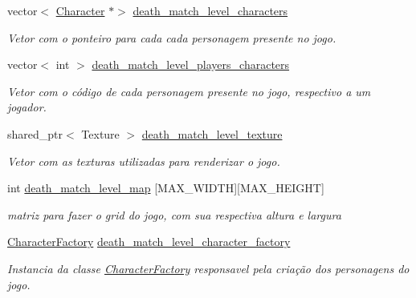 \begin{DoxyCompactItemize}
vector$<$ \mbox{\hyperlink{classCharacter}{Character}} $\ast$$>$ \mbox{\hyperlink{classDeathMatchLevel_aafe478e224732978a08161ab877a50aa}{death\+\_\+match\+\_\+level\+\_\+characters}}
\begin{DoxyCompactList}\small\item\em Vetor com o ponteiro para cada cada personagem presente no jogo. \end{DoxyCompactList}\item 
\mbox{\label{classDeathMatchLevel_a83bd77eb5fa0802f98f6e032353c7954}} 
vector$<$ int $>$ \mbox{\hyperlink{classDeathMatchLevel_a83bd77eb5fa0802f98f6e032353c7954}{death\+\_\+match\+\_\+level\+\_\+players\+\_\+characters}}
\begin{DoxyCompactList}\small\item\em Vetor com o código de cada personagem presente no jogo, respectivo a um jogador. \end{DoxyCompactList}\item 
\mbox{\label{classDeathMatchLevel_a0fd0a017cba486b4bf9e33870cc3c7d6}} 
shared\+\_\+ptr$<$ Texture $>$ \mbox{\hyperlink{classDeathMatchLevel_a0fd0a017cba486b4bf9e33870cc3c7d6}{death\+\_\+match\+\_\+level\+\_\+texture}}
\begin{DoxyCompactList}\small\item\em Vetor com as texturas utilizadas para renderizar o jogo. \end{DoxyCompactList}\item 
\mbox{\label{classDeathMatchLevel_af8fcfeb2da3f1d8b3d13ba68abab67b8}} 
int \mbox{\hyperlink{classDeathMatchLevel_af8fcfeb2da3f1d8b3d13ba68abab67b8}{death\+\_\+match\+\_\+level\+\_\+map}} \mbox{[}M\+A\+X\+\_\+\+W\+I\+D\+TH\mbox{]}\mbox{[}M\+A\+X\+\_\+\+H\+E\+I\+G\+HT\mbox{]}
\begin{DoxyCompactList}\small\item\em matriz para fazer o grid do jogo, com sua respectiva altura e largura \end{DoxyCompactList}\item 
\mbox{\label{classDeathMatchLevel_af344ee616243bccbff1170269db72956}} 
\mbox{\hyperlink{classCharacterFactory}{Character\+Factory}} \mbox{\hyperlink{classDeathMatchLevel_af344ee616243bccbff1170269db72956}{death\+\_\+match\+\_\+level\+\_\+character\+\_\+factory}}
\begin{DoxyCompactList}\small\item\em Instancia da classe \mbox{\hyperlink{classCharacterFactory}{Character\+Factory}} responsavel pela criação dos personagens do jogo. \end{DoxyCompactList}\end{DoxyCompactItemize}


